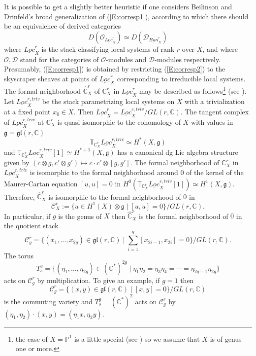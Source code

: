\documentclass[a4paper,10pt]{amsart}
\def\C{\mathbb{C}}
\def\g{\mathfrak{g}}
\numberwithin{equation}{section}
\begin{document}
It is possible to get a slightly better heuristic if one considers Beilinson and Drinfeld's broad generalization of (\ref{E:corresp1}), according to which there should be an equivalence of derived categories
\begin{equation}\label{E:corresp2}
D(\mathcal{O}_{\underline{Loc}^r_X}) \simeq D(\mathcal{D}_{\underline{Bun}^r_X})
\end{equation}
where $\underline{Loc}^r_X$ is the stack classifying local systems of rank $r$ over $X$, and where $\mathcal{O}, \mathcal{D}$ stand for the categories of $\mathcal{O}$-modules and $\mathcal{D}$-modules respectively. Presumably, (\ref{E:corresp1}) is obtained by restricting (\ref{E:corresp2}) to the skyscraper sheaves at points of $\underline{Loc}^r_X$ corresponding to irreducible local systems. The formal neighborhood $\widehat{\C}^r_X$ of $\C^r_X$ in $\underline{Loc}^r_X$ may be described as follows\footnote{the case of $X = \mathbb{P}^1$ is a little special (see \cite{Lafforgue}) so we assume that $X$ is of genus one or more.} (see \cite[Section~2]{BD}). Let $\underline{Loc}^{r,triv}_X$ be the stack parametrizing local systems on $X$ with a trivialization at a fixed point $x_0 \in X$. Then $\underline{Loc}^r_X=\underline{Loc}^{r,triv}_X/GL(r,\C)$. The tangent complex of $\underline{Loc}^{r,triv}_X$ at $\C^r_X$ is quasi-isomorphic to the cohomology of $X$ with values in $\g=\mathfrak{gl}(r,\C)$
$$\mathbb{T}_{\C^r_X} \underline{Loc}^{r,triv}_X \simeq H^*(X,\g)$$
and $\mathbb{T}_{\C^r_X} \underline{Loc}^{r,triv}_X[1] \simeq H^{*+1}(X,\g)$ has a canonical dg Lie algebra structure given by $(c \otimes g, c' \otimes g') \mapsto c \cdot c' \otimes [g,g']$. The formal neighborhood of $\C^r_X$ in $\underline{Loc}^{r,triv}_X$ is isomorphic to the formal neighborhood around $0$ of the kernel of the Maurer-Cartan equation $[u,u]=0$ in $H^0( \mathbb{T}_{\C^r_X} \underline{Loc}^{r,triv}_X[1]) \simeq H^{1}(X,\g)$. Therefore, $\widehat{\C}^r_X $ is isomorphic to the formal neighborhood of $0$ in
$$\mathcal{C}^r_X:= \{ u \in H^1(X) \otimes \mathfrak{g}\;|\; [u,u]=0\}/GL(r,\C).$$
In particular, if $g$ is the genus of $X$ then $\widehat{\C}^r_X$ is the formal neighborhood of $0$ in the quotient stack
$$\mathcal{C}^r_g=\big\{ (x_1, \ldots, x_{2g})\in \mathfrak{gl}(r,\C)\;|\;\sum_{i=1}^g [x_{2i-1},x_{2i}]=0\big\}/GL(r,\C).$$
The torus 
$$T^g_s=\{(\eta_1, \ldots, \eta_{2g}) \in (\C^*)^{2g}\;|\; \eta_1\eta_2=\eta_{3}\eta_4=\cdots=\eta_{2g-1}\eta_{2g}\}$$
acts on $\mathcal{C}^r_g$ by multiplication. To give an example, if $g=1$ then 
$$\mathcal{C}^r_g=\{(x,y) \in \mathfrak{gl}(r,\C)\;|\; [x,y]=0\}/GL(r,\C)$$ is the commuting variety and $T^g_s=(\C^*)^2$ acts on $\mathcal{C}^r_g$ by $(\eta_1, \eta_2) \cdot (x,y)=(\eta_1 x, \eta_2 y)$.
\end{document}

